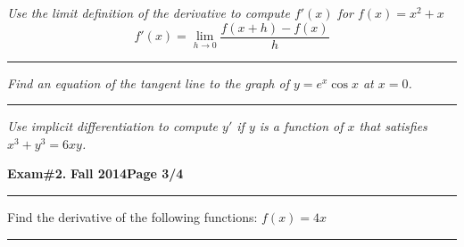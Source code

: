 \documentclass[12pt]{article}
\begin{document}
\bigskip
{\problem[10 pts] \em Use the limit definition of the derivative to
compute $f'(x)$ for $f(x)=x^2+x$}
\begin{equation*}
f'(x) = \lim_{h \to 0} \frac{ f(x+h)-f(x)}{h}
\end{equation*}
\vspace{2cm}
\begin{flushright}
\end{flushright}
\hrule
{\problem[20 pts] \em Find an equation of the tangent line to the graph
of $y=e^x \cos x$ at $x=0$.}
\vspace{4cm}
\begin{flushright}
\end{flushright}
\hrule
{\problem[20 pts] \em Use implicit differentiation to compute $y'$ if $y$ is a function of $x$ that satisfies $x^3+y^3=6xy$.}
\vspace{8cm}
\begin{flushright}
\end{flushright}
\newpage

\hfill{\large\bf Exam\#2.}\hfill{\large\bf
  Fall 2014}\hfill{\large\bf Page 3/4}\hrule

\bigskip
\noindent Find the derivative of the following functions:
{\problem[2 pts] $f(x)=4x$}
\begin{flushright}
\end{flushright}
\hrule
\end{document}
